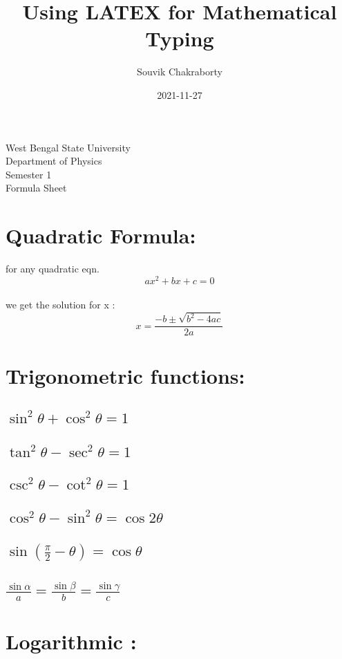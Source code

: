 \documentclass[27pt]{article}
\title {Using LATEX for Mathematical Typing}
\date {2021-11-27}
\author {Souvik Chakraborty}
\begin{document}
\maketitle
\begin {center}
West Bengal State University\\
Department of Physics\\
Semester 1  \\
Formula Sheet 
\end{center}

\section{Quadratic Formula:}
 for any quadratic eqn. $$ \displaystyle { ax^2 + bx + c = 0} $$ \\
   we get the solution for x : $$  x= \frac{-b\pm\sqrt{b^2-4ac}}{2a}  $$

\section{Trigonometric functions:}  
 \subsection{$ \sin^2\theta + \cos^2\theta = 1   $} 
 \subsection{$ \tan^2\theta - \sec^2\theta = 1   $} 
 \subsection{$ \csc^2\theta - \cot^2\theta = 1   $} 
 \subsection{$ \cos^2\theta-\sin^2\theta  = \cos {2\theta}   $} 
 \subsection{$ {\displaystyle \sin\left(\frac{\pi}{2} - \theta\right) = \cos\theta} $}
 \subsection{$ \displaystyle \frac{\sin\alpha}{a} = \frac{\sin\beta}{b} = \frac{\sin\gamma}{c} $}

\section{Logarithmic :}  
\end{document}
